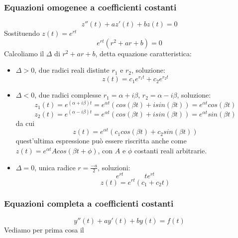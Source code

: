 \subsubsection{Equazioni omogenee a coefficienti costanti}
\[
    z''(t) + a z'(t) + bz(t) = 0
\]
Sostituendo $z(t) = e^{rt}$
\[
    e^{rt}(r^2 + a r + b) = 0
\]
Calcoliamo il $\Delta$ di $r^2 + a r + b$, detta equazione caratteristica:
\begin{itemize}
    \item $\Delta>0$, due radici reali distinte $r_1$ e $r_2$, soluzione:
    \[
        z(t) = c_1e^{r_1t} + c_2e^{r_2t}
    \]
    \item $\Delta <0$, due radici complesse $r_1 =\alpha + i \beta$, $r_2 = \alpha - i \beta$, soluzione:
    \[
        z_1(t) = e^{(\alpha + i \beta)t} =e^{\alpha t} (cos(\beta t) + i sin(\beta t)) = e^{\alpha t} cos(\beta t)
    \]
    \[
        z_2(t) = e^{(\alpha-i \beta)t} = e^{\alpha t}(cos(\beta t) + i sin(\beta t)) = e^{\alpha t} sin (\beta t)
    \]
    da cui
    \[
        z(t) = e^{\alpha t}(c_1 cos(\beta t) + c_2 sin (\beta t))
    \]
    quest'ultima espressione può essere riscritta anche come $z(t) = e^{\alpha t} A cos(\beta t + \phi)$, con $A$ e $\phi$ costanti reali arbitrarie.
    \item $\Delta = 0$, unica radice $r=\frac{-a}{2}$, soluzioni:
    \[
        e^{rt} \quad \quad \quad te^{rt}
    \] 
    \[
        z(t) = e^{rt}(c_1 + c_2 t)
    \]
\end{itemize}
\subsubsection{Equazioni completa a coefficienti costanti}
\[
    y''(t) + a y'(t) + b y(t) = f(t)
\]
Vediamo per prima cosa il 
